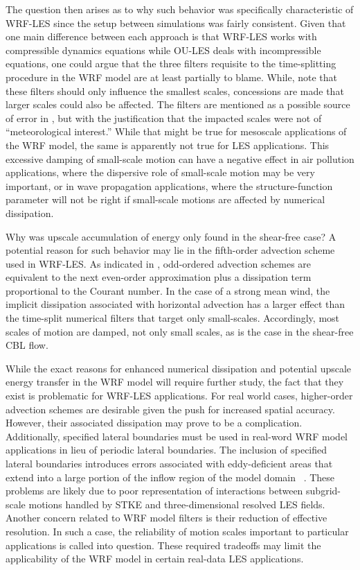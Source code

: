 The question then arises as to why such behavior was specifically characteristic of WRF-LES since the setup between simulations was fairly consistent. Given that one main difference between each approach is that WRF-LES works with compressible dynamics equations while OU-LES deals with incompressible equations, one could argue that the three filters requisite to the time-splitting procedure in the WRF model are at least partially to blame. While,  \citet{Skamarock92} note that these filters should only influence the smallest scales, concessions are made that larger scales could also be affected. The filters are mentioned as a possible source of error in  \citet{Skamarock04}, but with the justification that the impacted scales were not of ``meteorological interest.'' While that might be true for mesoscale applications of the WRF model, the same is apparently not true for LES applications. This excessive damping of small-scale motion can have a negative effect in air pollution applications, where the dispersive role of small-scale motion may be very important, or in wave propagation applications, where the structure-function parameter will not be right if small-scale motions are affected by numerical dissipation.

Why was upscale accumulation of energy only found in the shear-free case? A potential reason for such behavior may lie in the fifth-order advection scheme used in WRF-LES. As indicated in  \citet{Wicker02}, odd-ordered advection schemes are equivalent to the next even-order approximation plus a dissipation term proportional to the Courant number. In the case of a strong mean wind, the implicit dissipation associated with horizontal advection has a larger effect than the time-split numerical filters that target only small-scales. Accordingly, most scales of motion are damped, not only small scales, as is the case in the shear-free CBL flow.

While the exact reasons for enhanced numerical dissipation and potential upscale energy transfer in the WRF model will require further study, the fact that they exist is problematic for WRF-LES applications. For real world cases, higher-order advection schemes are desirable given the push for increased spatial accuracy. However, their associated dissipation may prove to be a complication. Additionally, specified lateral boundaries must be used in real-word WRF model applications in lieu of periodic lateral boundaries. The inclusion of specified lateral boundaries introduces errors associated with eddy-deficient areas that extend into a large portion of the inflow region of the model domain ~\citep{Moeng07}. These problems are likely due to poor representation of interactions between subgrid-scale motions handled by STKE and three-dimensional resolved LES fields. Another concern related to WRF model filters is their reduction of effective resolution. In such a case, the reliability of motion scales important to particular applications is called into question. These required tradeoffs may limit the applicability of the WRF model in certain real-data LES applications.

